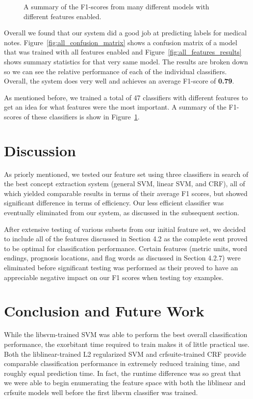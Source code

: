 \documentclass[preprint]{style}
\begin{document}
\begin{figure}[ht]
\begin{center}
\begin{tabular}{|l|l|l|l|l|l|l|l|l|l|l||l|l|}
\end{tabular}
\end{center}
\caption{A summary of the F1-scores from many different models with different features enabled.}
\label{fig:summary_f1_scores}
\end{figure}

Overall we found that our system did a good job at predicting labels for medical notes. Figure~\ref{fig:all_confusion_matrix} shows a confusion matrix of a model that was trained with all features enabled and Figure~\ref{fig:all_features_results} shows summary statistics for that very same model. The results are broken down so we can see the relative performance of each of the individual classifiers. Overall, the system does very well and achieves an average F1-score of {\bf 0.79}.

As mentioned before, we trained a total of 47 classifiers with different features to get an idea for what features were the most important. A summary of the F1-scores of these classifiers is show in Figure~\ref{fig:summary_f1_scores}.

\section{Discussion}

As priorly mentioned, we tested our feature set using three classifiers in search of the best concept extraction system (general SVM, linear SVM, and CRF), all of which yielded comparable results in terms of their average F1 scores, but showed significant difference in terms of efficiency. Our less efficient classifier was eventually eliminated from our system, as discussed in the subsequent section. 

After extensive testing of various subsets from our initial feature set, we decided to include all of the features discussed in Section 4.2 as the complete sent proved to be optimal for classification performance. Certain features (metric units, word endings, prognosis locations, and flag words as discussed in Section 4.2.7) were eliminated before significant testing was performed as their proved to have an appreciable negative impact on our F1 scores when testing toy examples. 

\section{Conclusion and Future Work}
While the libsvm-trained SVM was able to perform the best overall classification performance, the exorbitant time required to train makes it of little practical use. Both the liblinear-trained L2 regularized SVM and crfsuite-trained CRF provide comparable classification performance in extremely reduced training time, and roughly equal prediction time. In fact, the runtime difference was so great that we were able to begin enumerating the feature space with both the liblinear and crfsuite models well before the first libsvm classifier was trained.
\end{document}
